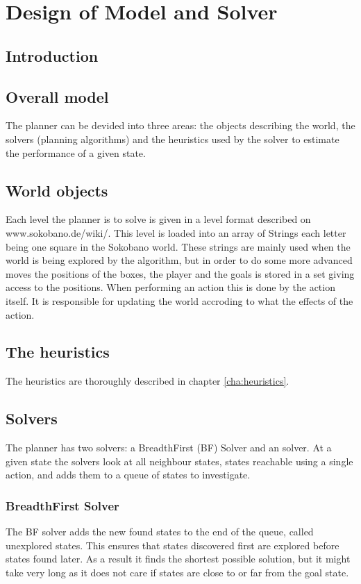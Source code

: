 \chapter{Design of Model and Solver}
\label{cha:design}

\section{Introduction}

\section{Overall model}
The planner can be devided into three areas: the objects describing
the world, the solvers (planning algorithms) and the heuristics used
by the \astar solver to estimate the performance of a given state.

\section{World objects}
Each level the planner is to solve is given in a level format
described on www.sokobano.de/wiki/. This level is loaded into an array
of Strings each letter being one square in the Sokobano world. These
strings are mainly used when the world is being explored by the
algorithm, but in order to do some more advanced moves the positions
of the boxes, the player and the goals is stored in a set giving
access to the positions.  When performing an action this is done by
the action itself. It is responsible for updating the world accroding
to what the effects of the action.

\section{The heuristics}
The heuristics are thoroughly described in chapter
\ref{cha:heuristics}.

\section{Solvers}
The planner has two solvers: a BreadthFirst (BF) Solver and an \astar
solver. At a given state the solvers look at all neighbour states,
states reachable using a single action, and adds them to a queue of
states to investigate.

\subsection{BreadthFirst Solver}
The BF solver adds the new found states to the end of the queue,
called unexplored states. This ensures that states discovered first
are explored before states found later. As a result it finds the
shortest possible solution, but it might take very long as it does not
care if states are close to or far from the goal state.

